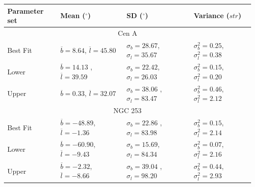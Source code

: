 \documentclass[12pt, a4 paper]{article}
\begin{document}
\label{AD_table}
\begin{center}
\begin{tabular}{|p{}|p{}|p{}|p{}|}
    \hline
    Parameter set & Mean (${}^\circ$)& SD (${}^\circ$) & Variance ($str$)\\
    \hline
    \multicolumn{4}{|c|}{Cen A} \\ 
    \hline
    \rule{0pt}{3ex} 
    Best Fit & $\overline{b} = 8.64$, $\overline{l} = 45.80 $& $\sigma_{b} = 28.67 $, $\sigma_{l} = 35.67$ & $\sigma^2_{b} = 0.25 $, $\sigma^2_{l} = 0.38$ \\
    \hline
    \rule{0pt}{3ex} 
     Lower & $\overline{b} = 14.13$  , $\overline{l} = 39.59$ & $\sigma_{b} = 22.42$, $\sigma_{l} = 26.03$ & $\sigma^2_{b} = 0.15 $, $\sigma^2_{l} = 0.20$\\
    \hline
    \rule{0pt}{3ex} 
     Upper & $\overline{b} = 0.33$, $\overline{l} = 32.07$ & $\sigma_{b} = 38.06$ , $\sigma_{l} = 83.47$ & $\sigma^2_{b} = 0.46 $, $\sigma^2_{l} = 2.12$\\
    \hline
  \multicolumn{4}{|c|}{NGC 253} \\ 
    \hline
    \rule{0pt}{3ex} 
    Best Fit & $\overline{b} = -48.89$, $\overline{l} = -1.36$  & $\sigma_{b} = 22.86$ , $\sigma_{l} = 83.98$ & $\sigma^2_{b} = 0.15 $, $\sigma^2_{l} = 2.14$ \\
    \hline
    \rule{0pt}{3ex} 
     Lower & $\overline{b} = -60.90 $, $\overline{l} = -9.43$ & $\sigma_{b} = 15.69$, $\sigma_{l} = 84.34 $ & $\sigma^2_{b} = 0.07 $, $\sigma^2_{l} = 2.16$\\
    \hline
    \rule{0pt}{3ex} 
     Upper & $\overline{b} = -2.32$, $\overline{l} = -8.66$ & $\sigma_{b} = 39.04$ , $\sigma_{l} = 98.20 $& $\sigma^2_{b} = 0.44 $, $\sigma^2_{l} = 2.93$\\
    \hline
\end{tabular}
\end{center}
\newpage
\end{document}

